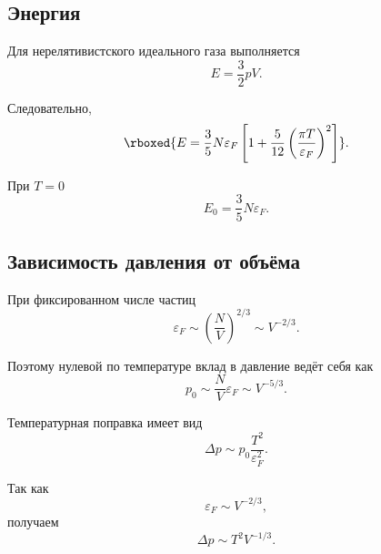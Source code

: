 \documentclass[../final.tex]{subfiles}
\begin{document}
\subsection{Энергия}

Для нерелятивистского идеального газа выполняется
%
\begin{equation*}
    E
    =
    \frac{3}{2}pV.
\end{equation*}

Следовательно,
%
\[
    \rboxed{
        E
        =
        \frac{3}{5}
        N\varepsilon_F
        \left[
            1
            +
            \frac{5}{12}
            \left(
                \frac{\pi T}{\varepsilon_F}
            \right)^2
        \right]
    }.
\]

При $T=0$
%
\begin{equation*}
    E_0
    =
    \frac{3}{5}
    N\varepsilon_F.
\end{equation*}


\subsection{Зависимость давления от объёма}

При фиксированном числе частиц
%
\begin{equation*}
    \varepsilon_F
    \sim
    \left(
        \frac{N}{V}
    \right)^{2/3}
    \sim
    V^{-2/3}.
\end{equation*}

Поэтому нулевой по температуре вклад в давление ведёт себя как
%
\begin{equation*}
    p_0
    \sim
    \frac{N}{V}\varepsilon_F
    \sim
    V^{-5/3}.
\end{equation*}

Температурная поправка имеет вид
%
\begin{equation*}
    \Delta p
    \sim
    p_0
    \frac{T^2}{\varepsilon_F^2}.
\end{equation*}

Так как
%
\begin{equation*}
    \varepsilon_F
    \sim
    V^{-2/3},
\end{equation*}
%
получаем
%
\begin{equation*}
    \Delta p
    \sim
    T^2V^{-1/3}.
\end{equation*}
\end{document}
